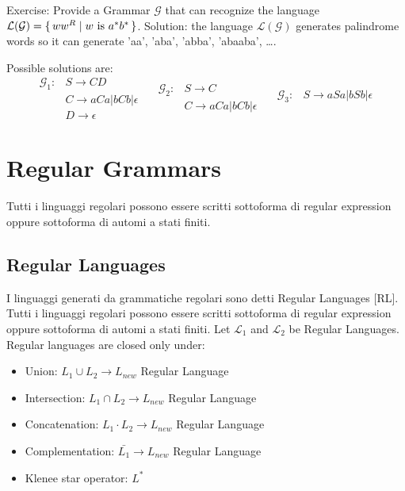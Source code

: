 \noindent
Exercise: Provide a Grammar $\mathcal{G}$ that can recognize the language $\mathcal{L(G)} = \set{ ww^R | w\text{ is }a^*b^*}$.
\noindent
Solution: the language $\mathcal{L(G)}$ generates palindrome words so it can generate 'aa', 'aba', 'abba', 'abaaba', \dots.

\noindent
Possible solutions are:
\[
\begin{aligned}
\mathcal{G_\text{1}}: &S \rightarrow CD\\
&C \rightarrow aCa | bCb | \epsilon\\
&D \rightarrow \epsilon
\end{aligned}
\quad
\begin{aligned}
\mathcal{G_\text{2}}: &S \rightarrow C\\
&C \rightarrow aCa | bCb | \epsilon
\end{aligned}
\quad
\begin{aligned}
\mathcal{G_\text{3}}: &S \rightarrow aSa | bSb | \epsilon\\
\end{aligned}
\]

\section{Regular Grammars}
Tutti i linguaggi regolari possono essere scritti sottoforma di regular expression oppure sottoforma di automi a stati finiti.

\subsection{Regular Languages}
I linguaggi generati da grammatiche regolari sono detti Regular Languages [RL].
Tutti i linguaggi regolari possono essere scritti sottoforma di regular expression oppure sottoforma di automi a stati finiti.
Let $\mathcal{L_1}$ and $\mathcal{L_2}$ be Regular Languages.
Regular languages are closed only under:
\begin{itemize}
\item Union: $L_1 \cup L_2 \rightarrow L_{new}$ Regular Language
\item Intersection: $L_1 \cap L_2 \rightarrow L_{new}$ Regular Language
\item Concatenation: $L_1 \cdot L_2 \rightarrow L_{new}$ Regular Language
\item Complementation: $\bar{L_1} \rightarrow L_{new}$ Regular Language
\item Klenee star operator: $L^*$
\end{itemize}
